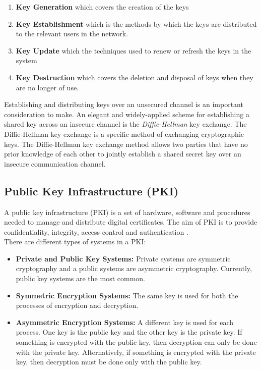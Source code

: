 \documentclass[11pt, a4paper, notitlepage]{article}
\begin{document}
\begin{enumerate}
\item \textbf{Key Generation} which covers the creation of the keys
\item \textbf{Key Establishment} which is the methods by which the keys are distributed to the relevant users in the network.
\item \textbf{Key Update} which the techniques used to renew or refresh the keys in the system 
\item \textbf{Key Destruction} which covers the deletion and disposal of keys when they are no longer of use.
\end{enumerate}

Establishing and distributing keys over an unsecured channel is an important consideration to make. An elegant and widely-applied scheme for establishing a shared key across an insecure channel is the \emph{Diffie-Hellman} key exchange. The Diffie-Hellman key exchange is a specific method of exchanging cryptographic keys. The Diffie-Hellman key exchange method allows two parties that have no prior knowledge of each other to jointly establish a shared secret key over an insecure communication channel. \\


\subsection*{Public Key Infrastructure (PKI)}
A public key infrastructure (PKI) is a set of hardware, software and procedures needed to manage and distribute digital certificates. The aim of PKI is to provide confidentiality, integrity, access control and authentication \cite{PKI:Online}. \\

There are different types of systems in a PKI:
\begin{itemize}
\item \textbf{Private and Public Key Systems:} Private systems are symmetric cryptography and a public systems are asymmetric cryptography. Currently, public key systems are the most common.
\item \textbf{Symmetric Encryption Systems:} The same key is used for both the processes of encryption and decryption.
\item \textbf{Asymmetric Encryption Systems:} A different key is used for each process. One key is the public key and the other key is the private key. If something is encrypted with the public key, then decryption can only be done with the private key. Alternatively, if something is encrypted with the private key, then decryption must be done only with the public key.
\end{itemize}
\end{document}
